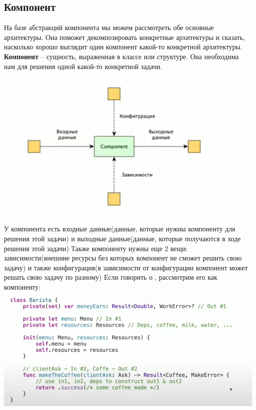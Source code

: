 \documentclass{article}
\begin{document}
    \subsection{Компонент}
    На базе абстракций компонента мы можем рассмотреть обе основные архитектуры. Она поможет декомпозировать конкретные архитектуры и сказать, насколько хорошо выглядит один компонент какой-то конкретной архитектуры. 
    \newline
    \textbf{Компонент} -- сущность, выраженная в классе или структуре. Она необходима нам для решения одной какой-то конкретной задачи. 
    \newline
    \includegraphics[scale = 0.5]{pic/Снимок экрана 2023-07-30 в 18.27.25.png}
    \newline
    У компонента есть входные данные(данные, которые нужны компоненту для решения этой задачи) и выходные данные(данные, которые получаются в ходе решения этой задачи)
    \newline
    Также компоненту нужны еще 2 вещи: зависимости(внешние ресурсы без которых компонент не сможет решить свою задачу) и также конфигурация(в зависимости от конфигурации компонент может решать свою задачу по разному)
    \newline
    Если говорить о , рассмотрим его как компоненту: 
    \newline
    \includegraphics[scale = 0.5]{pic/Снимок экрана 2023-07-30 в 18.30.15.png}
\end{document}
